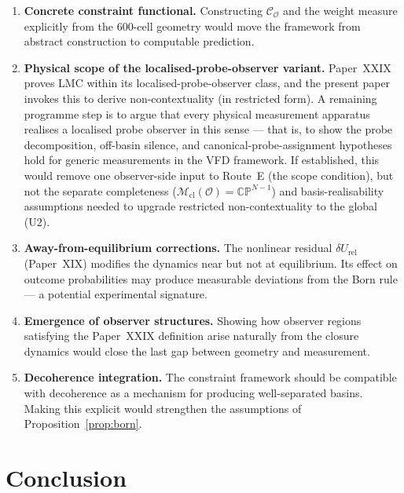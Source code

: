 \documentclass[12pt]{article}
\newcommand{\Ocal}{\mathcal{O}}
\newcommand{\Ccal}{\mathcal{C}}
\newcommand{\Mcl}{\mathcal{M}_{\mathrm{cl}}}
\begin{document}
\begin{enumerate}
    \item \textbf{Concrete constraint functional.} Constructing $\Ccal_\Ocal$ and the weight measure explicitly from the 600-cell geometry would move the framework from abstract construction to computable prediction.

    \item \textbf{Physical scope of the localised-probe-observer variant.} Paper~XXIX proves LMC within its localised-probe-observer class, and the present paper invokes this to derive non-contextuality (in restricted form). A remaining programme step is to argue that every physical measurement apparatus realises a localised probe observer in this sense --- that is, to show the probe decomposition, off-basin silence, and canonical-probe-assignment hypotheses hold for generic measurements in the VFD framework. If established, this would remove one observer-side input to Route~E (the scope condition), but not the separate completeness ($\Mcl(\Ocal) = \mathbb{CP}^{N-1}$) and basis-realisability assumptions needed to upgrade restricted non-contextuality to the global (U2).

    \item \textbf{Away-from-equilibrium corrections.} The nonlinear residual $\delta U_{\mathrm{rel}}$ (Paper~XIX) modifies the dynamics near but not at equilibrium. Its effect on outcome probabilities may produce measurable deviations from the Born rule --- a potential experimental signature.

    \item \textbf{Emergence of observer structures.} Showing how observer regions satisfying the Paper~XXIX definition arise naturally from the closure dynamics would close the last gap between geometry and measurement.

    \item \textbf{Decoherence integration.} The constraint framework should be compatible with decoherence as a mechanism for producing well-separated basins. Making this explicit would strengthen the assumptions of Proposition~\ref{prop:born}.
\end{enumerate}

\section{Conclusion}\label{sec:conclusion}
\end{document}

